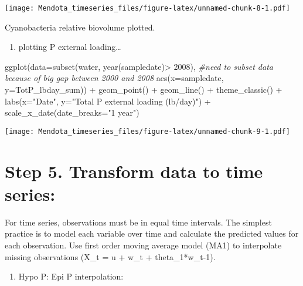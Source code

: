 \documentclass[
]{article}
\newenvironment{Shaded}{\begin{snugshade}}{\end{snugshade}}
\newcommand{\AttributeTok}[1]{\textcolor[rgb]{0.77,0.63,0.00}{#1}}
\newcommand{\CommentTok}[1]{\textcolor[rgb]{0.56,0.35,0.01}{\textit{#1}}}
\newcommand{\DecValTok}[1]{\textcolor[rgb]{0.00,0.00,0.81}{#1}}
\newcommand{\FunctionTok}[1]{\textcolor[rgb]{0.00,0.00,0.00}{#1}}
\newcommand{\NormalTok}[1]{#1}
\newcommand{\SpecialCharTok}[1]{\textcolor[rgb]{0.00,0.00,0.00}{#1}}
\newcommand{\StringTok}[1]{\textcolor[rgb]{0.31,0.60,0.02}{#1}}
\providecommand{\tightlist}{%
  \setlength{\itemsep}{0pt}\setlength{\parskip}{0pt}}
\begin{document}
\texttt{[image: Mendota\_timeseries\_files/figure-latex/unnamed-chunk-8-1.pdf]}

Cyanobacteria relative biovolume plotted.

\begin{enumerate}
\def\labelenumi{\alph{enumi})}
\setcounter{enumi}{3}
\tightlist
\item
  plotting P external loading\ldots{}
\end{enumerate}

\begin{Shaded}
\begin{Highlighting}[]
\FunctionTok{ggplot}\NormalTok{(}\AttributeTok{data=}\FunctionTok{subset}\NormalTok{(water, }\FunctionTok{year}\NormalTok{(sampledate)}\SpecialCharTok{\textgreater{}} \DecValTok{2008}\NormalTok{), }\CommentTok{\#need to subset data because of big gap between 2000 and 2008}
       \FunctionTok{aes}\NormalTok{(}\AttributeTok{x=}\NormalTok{sampledate,  }\AttributeTok{y=}\NormalTok{TotP\_lbday\_sum)) }\SpecialCharTok{+}
  \FunctionTok{geom\_point}\NormalTok{() }\SpecialCharTok{+}
  \FunctionTok{geom\_line}\NormalTok{() }\SpecialCharTok{+} 
  \FunctionTok{theme\_classic}\NormalTok{() }\SpecialCharTok{+}
  \FunctionTok{labs}\NormalTok{(}\AttributeTok{x=}\StringTok{"Date"}\NormalTok{, }\AttributeTok{y=}\StringTok{"Total P external loading (lb/day)"}\NormalTok{) }\SpecialCharTok{+}
  \FunctionTok{scale\_x\_date}\NormalTok{(}\AttributeTok{date\_breaks=}\StringTok{"1 year"}\NormalTok{)}
\end{Highlighting}
\end{Shaded}

\texttt{[image: Mendota\_timeseries\_files/figure-latex/unnamed-chunk-9-1.pdf]}

\hypertarget{step-5.-transform-data-to-time-series}{%
\section{Step 5. Transform data to time
series:}\label{step-5.-transform-data-to-time-series}}

For time series, observations must be in equal time intervals. The
simplest practice is to model each variable over time and calculate the
predicted values for each observation. Use first order moving average
model (MA1) to interpolate missing observations (X\_t = u + w\_t +
theta\_1*w\_t-1).

\begin{enumerate}
\def\labelenumi{\alph{enumi})}
\tightlist
\item
  Hypo P: Epi P interpolation:
\end{enumerate}
\end{document}
